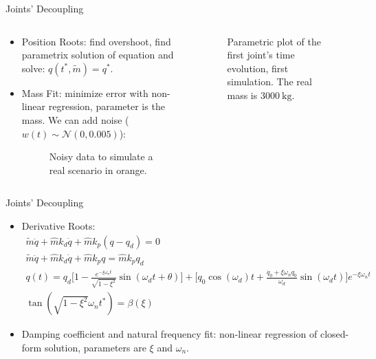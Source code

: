 \begin{frame}{Joints' Decoupling}
  \begin{columns}
    \begin{column}{0.5\textwidth}
      \begin{itemize}
        \item Position Roots: find overshoot, find parametrix solution of equation and solve: $q(t^*,\tilde{m})=q^*$.
        \item Mass Fit: minimize error with non-linear regression, parameter is the mass. We can add noise ($w(t)\sim \mathcal{N} (0,0.005)$):
        \vspace{2mm}
        \begin{figure}
          \centering
          
          \caption{Noisy data to simulate a real scenario in orange.}
        \end{figure}
      \end{itemize}
    \end{column}
    \begin{column}{0.5\textwidth}
      \begin{figure}
        \centering
        
        \caption{Parametric plot of the first joint's time evolution, first simulation. The real mass is $\SI{3000}{\kilogram}$.}
      \end{figure}
    \end{column}
  \end{columns}
\end{frame}

\begin{frame}{Joints' Decoupling}
  \begin{itemize}
    \item Derivative Roots:
    \begin{equation}
      \begin{array}{c}
        \tilde{m}\ddot{q}+\hat{m}k_d\dot{q}+\hat{m}k_p (q-q_d)=0\\
        \tilde{m}\ddot{q}+\hat{m}k_d\dot{q}+\hat{m}k_p q=\hat{m}k_pq_d\\
        q(t)=q_d\Big[1-\frac{e^{-\xi\omega_nt}}{\sqrt{1-\xi^2}}\sin{(\omega_dt+\theta)}\Big]+\Big[q_0\cos{(\omega_d)t}+\frac{\dot{q}_0+\xi\omega_n q_0}{\omega_d}\sin{(\omega_dt)}\Big]e^{-\xi \omega_n t}\\
        \tan{(\sqrt{1-\xi^2}\omega_nt^*)}=\beta(\xi)
      \end{array}
    \end{equation}
    \item Damping coefficient and natural frequency fit: non-linear regression of closed-form solution, parameters are $\xi$ and $\omega_n$.
  \end{itemize}
\end{frame}

